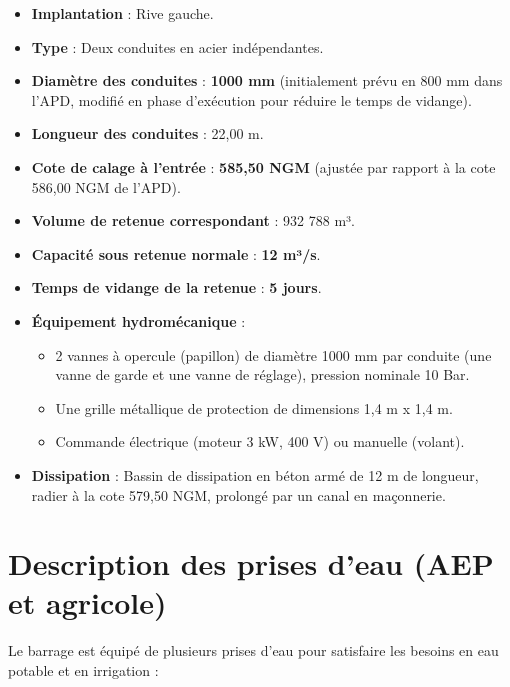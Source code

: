 \begin{itemize}
    \item \textbf{Implantation} : Rive gauche.
    \item \textbf{Type} : Deux conduites en acier indépendantes.
    \item \textbf{Diamètre des conduites} : \textbf{1000 mm} (initialement prévu en 800 mm dans l'APD, modifié en phase d'exécution pour réduire le temps de vidange).
    \item \textbf{Longueur des conduites} : 22,00 m.
    \item \textbf{Cote de calage à l'entrée} : \textbf{585,50 NGM} (ajustée par rapport à la cote 586,00 NGM de l'APD).
    \item \textbf{Volume de retenue correspondant} : 932 788 m³.
    \item \textbf{Capacité sous retenue normale} : \textbf{12 m³/s}.
    \item \textbf{Temps de vidange de la retenue} : \textbf{5 jours}.
    \item \textbf{Équipement hydromécanique} :
    \begin{itemize}
        \item 2 vannes à opercule (papillon) de diamètre 1000 mm par conduite (une vanne de garde et une vanne de réglage), pression nominale 10 Bar.
        \item Une grille métallique de protection de dimensions 1,4 m x 1,4 m.
        \item Commande électrique (moteur 3 kW, 400 V) ou manuelle (volant).
    \end{itemize}
    \item \textbf{Dissipation} : Bassin de dissipation en béton armé de 12 m de longueur, radier à la cote 579,50 NGM, prolongé par un canal en maçonnerie.
\end{itemize}

\section{Description des prises d'eau (AEP et agricole)}
\label{sec:prises_eau}

Le barrage est équipé de plusieurs prises d'eau pour satisfaire les besoins en eau potable et en irrigation \cite{fiche_synoptique, fiche_organes_restitution} :

